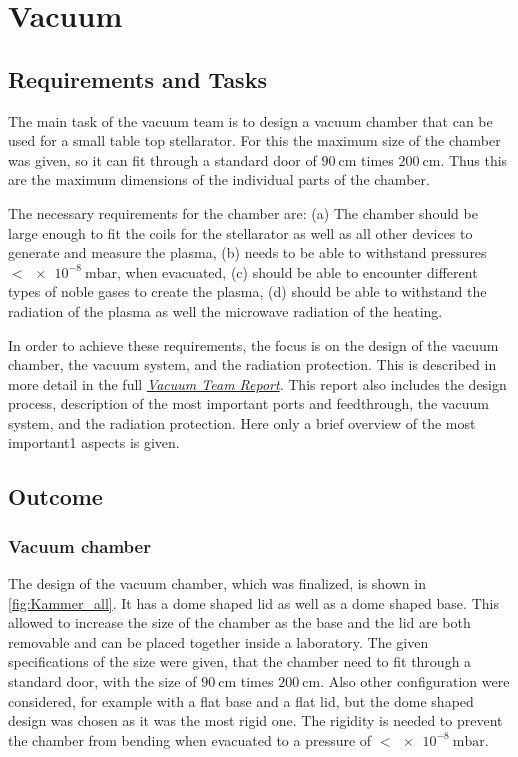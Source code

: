 \section{Vacuum}
\subsection{Requirements and Tasks}

The main task of the vacuum team is to design a vacuum chamber that can be used for a small table top stellarator.
For this the maximum size of the chamber was given, so it can fit through a standard door of $\SI{90}{\centi\meter}$ times $\SI{200}{\centi\meter}$.
Thus this are the maximum dimensions of the individual parts of the chamber.

The necessary requirements for the chamber are:
(a) The chamber should be large enough to fit the coils for the stellarator as well as all other devices to generate and measure the plasma,
(b) needs to be able to withstand pressures $<\SI{e-8}{\milli\bar}$, when evacuated,
(c) should be able to encounter different types of noble gases to create the plasma,
(d) should be able to withstand the radiation of the plasma as well the microwave radiation of the heating.

In order to achieve these requirements, the focus is on the design of the vacuum chamber, the vacuum system, and the radiation protection.
This is described in more detail in the full \href{https://www.overleaf.com/3861427278qpnrdmbhknty#518852}{\emph{Vacuum Team Report}}.
This report also includes the design process, description of the most important ports and feedthrough, the vacuum system, and the radiation protection.
Here only a brief overview of the most important1 aspects is given.

\subsection{Outcome}

\subsubsection{Vacuum chamber}

The design of the vacuum chamber, which was finalized, is shown in \autoref{fig:Kammer_all}.
It has a dome shaped lid as well as a dome shaped base.
This allowed to increase the size of the chamber as the base and the lid are both removable and can be placed together inside a laboratory.
The given specifications of the size were given, that the chamber need to fit through a standard door, with the size of $\SI{90}{\centi\meter}$ times $\SI{200}{\centi\meter}$.
Also other configuration were considered, for example with a flat base and a flat lid, but the dome shaped design was chosen as it was the most rigid one.
The rigidity is needed to prevent the chamber from bending when evacuated to a pressure of $<\SI{e-8}{\milli\bar}$.

